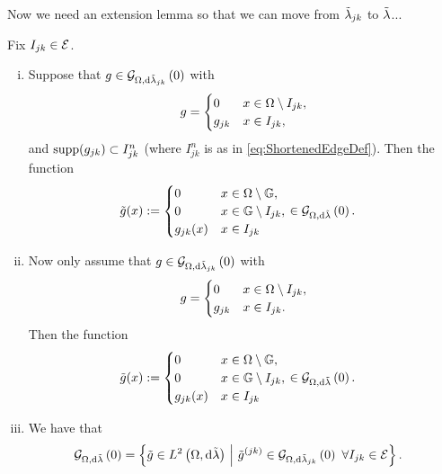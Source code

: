 Now we need an extension lemma so that we can move from $\tilde{\lambda}_{jk}$ to $\tilde{\lambda}$...
\begin{prop} \label{prop:SI-GradZeroExtension}
	Fix $I_{jk}\in\mathcal{E}$.
	\begin{enumerate}[(i)]
		\item Suppose that $g\in\mathcal{G}_{ \Omega, \mathrm{d}\tilde{\lambda}_{jk}}\left( 0 \right)$ with
		\begin{align*}
			g = \begin{cases} 0 & x\in\Omega\setminus I_{jk}, \\ g_{jk} & x\in I_{jk}, \end{cases}
		\end{align*}
		and $\mathrm{supp}(g_{jk})\subset I_{jk}^n$ (where $I_{jk}^n$ is as in \eqref{eq:ShortenedEdgeDef}).
		Then the function
		\begin{align*}
			\tilde{g}(x) &:= \begin{cases} 0 & x\in\Omega\setminus\mathbb{G}, \\ 0 & x\in\mathbb{G}\setminus I_{jk}, \\ g_{jk}(x) & x\in I_{jk} \end{cases}
			\in\mathcal{G}_{ \Omega, \mathrm{d}\tilde{\lambda}}\left( 0 \right).
		\end{align*}
		\item Now only assume that $g\in\mathcal{G}_{ \Omega, \mathrm{d}\tilde{\lambda}_{jk}}\left( 0 \right)$ with
		\begin{align*}
			g = \begin{cases} 0 & x\in\Omega\setminus I_{jk}, \\ g_{jk} & x\in I_{jk}. \end{cases}
		\end{align*}
		Then the function
		\begin{align*}
			\tilde{g}(x) &:= \begin{cases} 0 & x\in\Omega\setminus\mathbb{G}, \\ 0 & x\in\mathbb{G}\setminus I_{jk}, \\ g_{jk}(x) & x\in I_{jk} \end{cases}
			\in\mathcal{G}_{ \Omega, \mathrm{d}\tilde{\lambda}}\left( 0 \right).
		\end{align*}
		\item We have that
		\begin{align*}
			\mathcal{G}_{ \Omega, \mathrm{d}\tilde{\lambda}}\left( 0 \right) &= \left\{  \tilde{g}\in L^{2}\left( \Omega,\mathrm{d}\tilde{\lambda} \right) \ \middle\vert \  \tilde{g}^{(jk)}\in\mathcal{G}_{ \Omega, \mathrm{d}\tilde{\lambda}_{jk}}\left( 0 \right) \ \forall I_{jk}\in\mathcal{E}  \right\}.
		\end{align*}
	\end{enumerate}
\end{prop}
